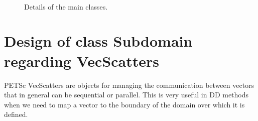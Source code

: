 \documentclass[a4paper,11pt]{report}
\begin{document}
\begin{figure}[h]
\centering
{}~ ~
\qquad
{}~ ~
\caption{Details of the main classes.}
\label{fg:detailsStructures}
\end{figure}


\section{Design of class Subdomain regarding VecScatters}
PETSc VecScatters are objects for managing the communication between
vectors that in general can be sequential or parallel. This is very
useful in DD methods when we need to map a vector to the boundary of
the domain over which it is defined.
\end{document}
